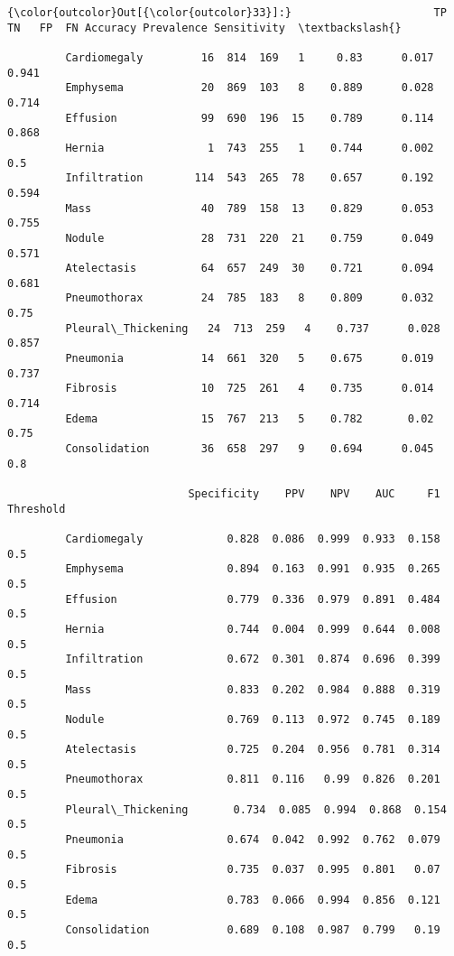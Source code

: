 \documentclass[11pt]{article}
\begin{document}
\begin{Verbatim}[commandchars=\\\{\}]
{\color{outcolor}Out[{\color{outcolor}33}]:}                      TP   TN   FP  FN Accuracy Prevalence Sensitivity  \textbackslash{}
                                                                                 
         Cardiomegaly         16  814  169   1     0.83      0.017       0.941   
         Emphysema            20  869  103   8    0.889      0.028       0.714   
         Effusion             99  690  196  15    0.789      0.114       0.868   
         Hernia                1  743  255   1    0.744      0.002         0.5   
         Infiltration        114  543  265  78    0.657      0.192       0.594   
         Mass                 40  789  158  13    0.829      0.053       0.755   
         Nodule               28  731  220  21    0.759      0.049       0.571   
         Atelectasis          64  657  249  30    0.721      0.094       0.681   
         Pneumothorax         24  785  183   8    0.809      0.032        0.75   
         Pleural\_Thickening   24  713  259   4    0.737      0.028       0.857   
         Pneumonia            14  661  320   5    0.675      0.019       0.737   
         Fibrosis             10  725  261   4    0.735      0.014       0.714   
         Edema                15  767  213   5    0.782       0.02        0.75   
         Consolidation        36  658  297   9    0.694      0.045         0.8   
         
                            Specificity    PPV    NPV    AUC     F1 Threshold  
                                                                               
         Cardiomegaly             0.828  0.086  0.999  0.933  0.158       0.5  
         Emphysema                0.894  0.163  0.991  0.935  0.265       0.5  
         Effusion                 0.779  0.336  0.979  0.891  0.484       0.5  
         Hernia                   0.744  0.004  0.999  0.644  0.008       0.5  
         Infiltration             0.672  0.301  0.874  0.696  0.399       0.5  
         Mass                     0.833  0.202  0.984  0.888  0.319       0.5  
         Nodule                   0.769  0.113  0.972  0.745  0.189       0.5  
         Atelectasis              0.725  0.204  0.956  0.781  0.314       0.5  
         Pneumothorax             0.811  0.116   0.99  0.826  0.201       0.5  
         Pleural\_Thickening       0.734  0.085  0.994  0.868  0.154       0.5  
         Pneumonia                0.674  0.042  0.992  0.762  0.079       0.5  
         Fibrosis                 0.735  0.037  0.995  0.801   0.07       0.5  
         Edema                    0.783  0.066  0.994  0.856  0.121       0.5  
         Consolidation            0.689  0.108  0.987  0.799   0.19       0.5  
\end{Verbatim}
            
\end{document}

